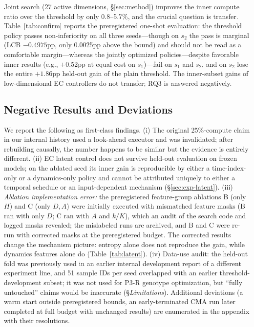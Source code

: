 \documentclass[11pt]{article}
\begin{document}
Joint search (27 active dimensions, \S\ref{sec:method}) improves the inner compute ratio over the threshold by only 0.8--5.7\%, and the crucial question is transfer. Table~\ref{tab:confirm} reports the preregistered one-shot evaluation: the threshold policy passes non-inferiority on all three seeds---though on $s_2$ the pass is marginal (LCB $-0.4975$pp, only 0.0025pp above the bound) and should not be read as a comfortable margin---whereas the jointly optimized policies---despite favorable inner results (e.g., $+0.52$pp at equal cost on $s_1$)---fail on $s_1$ and $s_2$, and on $s_2$ lose the entire $+1.86$pp held-out gain of the plain threshold. The inner-subset gains of low-dimensional EC controllers do not transfer; RQ3 is answered negatively.

\subsection{Negative Results and Deviations}
\label{sec:negative}
We report the following as first-class findings. (i) The original 25\%-compute claim in our internal history used a look-ahead executor and was invalidated; after rebuilding causally, the number happens to be similar but the evidence is entirely different. (ii) EC latent control does not survive held-out evaluation on frozen models; on the ablated seed its inner gain is reproducible by either a time-index-only or a dynamics-only policy and cannot be attributed uniquely to either a temporal schedule or an input-dependent mechanism (\S\ref{sec:exp-latent}). (iii) \emph{Ablation implementation error:} the preregistered feature-group ablations B (only $H$) and C (only $D,A$) were initially executed with mismatched feature masks (B ran with only $D$; C ran with $A$ and $k/K$), which an audit of the search code and logged masks revealed; the mislabeled runs are archived, and B and C were re-run with corrected masks at the preregistered budget. The corrected results change the mechanism picture: entropy alone does not reproduce the gain, while dynamics features alone do (Table~\ref{tab:latent}). (iv) Data-use audit: the held-out fold was previously used in an earlier internal development report of a different experiment line, and 51 sample IDs per seed overlapped with an earlier threshold-development subset; it was not used for P3-R genotype optimization, but ``fully untouched'' claims would be inaccurate (\S\textit{Limitations}). Additional deviations (a warm start outside preregistered bounds, an early-terminated CMA run later completed at full budget with unchanged results) are enumerated in the appendix with their resolutions.
\end{document}
